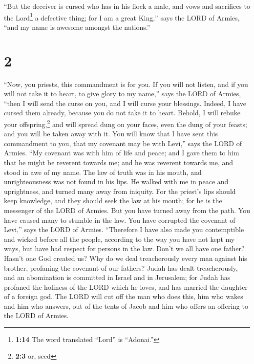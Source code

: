  ``But the deceiver is cursed who has in his flock a
male, and vows and sacrifices to the Lord\footnote{\textbf{1:14} The
  word translated ``Lord'' is ``Adonai.''} a defective thing; for I am a
great King,'' says the LORD of Armies, ``and my name is awesome amongst
the nations.''

\hypertarget{section-1}{%
\section{2}\label{section-1}}

 ``Now, you priests, this commandment is for you.
 If you will not listen, and if you will not take it to
heart, to give glory to my name,'' says the LORD of Armies, ``then I
will send the curse on you, and I will curse your blessings. Indeed, I
have cursed them already, because you do not take it to heart.
 Behold, I will rebuke your offspring,\footnote{\textbf{2:3}
  or, seed} and will spread dung on your faces, even the dung of your
feasts; and you will be taken away with it.  You will know
that I have sent this commandment to you, that my covenant may be with
Levi,'' says the LORD of Armies.  ``My covenant was with
him of life and peace; and I gave them to him that he might be reverent
towards me; and he was reverent towards me, and stood in awe of my name.
 The law of truth was in his mouth, and unrighteousness
was not found in his lips. He walked with me in peace and uprightness,
and turned many away from iniquity.  For the priest's lips
should keep knowledge, and they should seek the law at his mouth; for he
is the messenger of the LORD of Armies.  But you have
turned away from the path. You have caused many to stumble in the law.
You have corrupted the covenant of Levi,'' says the LORD of Armies.
 ``Therefore I have also made you contemptible and wicked
before all the people, according to the way you have not kept my ways,
but have had respect for persons in the law.  Don't we
all have one father? Hasn't one God created us? Why do we deal
treacherously every man against his brother, profaning the covenant of
our fathers?  Judah has dealt treacherously, and an
abomination is committed in Israel and in Jerusalem; for Judah has
profaned the holiness of the LORD which he loves, and has married the
daughter of a foreign god.  The LORD will cut off the man
who does this, him who wakes and him who answers, out of the tents of
Jacob and him who offers an offering to the LORD of Armies.

